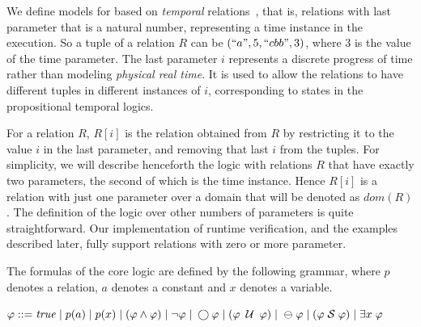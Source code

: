 
We define models for \FLTL{} based on {\em temporal} relations~\cite{Chomicki}, that is, relations with
last parameter
that is a natural number, representing a time instance
in the execution. So a tuple of
a relation $R$ can be $(``a", 5, ``cbb", 3)$, where $3$ is
the value of the time parameter. The last parameter $i$ represents a discrete progress of time
rather than modeling {\em physical real time}. It
is used to allow the relations to have
different tuples in different instances of $i$,
corresponding to states in the propositional temporal
logics.

For a relation $R$, $R [ i ]$ is the relation obtained from $R$ by
restricting it to the value $i$ in the last parameter, and removing that last $i$ from the tuples. For simplicity, we will describe henceforth
the logic with relations $R$ that have exactly two parameters, the second of which is the time instance. 
Hence $R [ i ]$ is a relation with just one parameter over a domain
that will be denoted as $dom ( R )$. The definition of the logic over other numbers of parameters is quite straightforward. Our implementation of runtime verification, and the examples described later, fully support relations with zero or more parameter. 



The formulas of the core \FLTL{} logic are 
defined by the following grammar, where $p$ denotes a relation,
$a$ denotes a constant and $x$ denotes a variable. 
\begin{center}
$\varphi ::= \mathit{true}  \; | \;
    p ( a ) \; | \;
    p ( x ) \; | \;
    ( \varphi \wedge \varphi ) \;  |   \;
   \neg \varphi \; | \;
   \bigcirc \varphi \; | \; 
   ( \varphi \; \mathbin{\mathcal{U}} \; \varphi ) \; | $ %
   $ \ominus \; \varphi \; | \;
    ( \varphi  \; {\cal S}  \; \varphi ) \; | \;
    \exists x \; \varphi$
\end{center}

